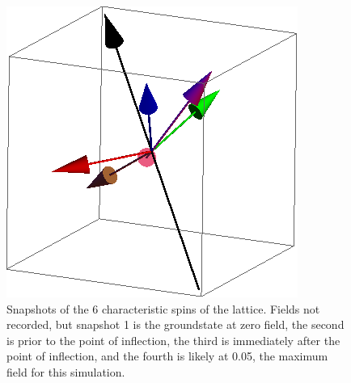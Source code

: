 \documentclass{article}
\begin{document}
\begin{figure}[ht]
\includegraphics[scale=0.27]{111_2000/4S000to005R.png}
\caption{Snapshots of the 6 characteristic spins of the lattice. Fields not recorded, but snapshot 1 is the groundstate
at zero field, the second is prior to the point of inflection, the third is immediately after the point of inflection,
and the fourth is likely at 0.05, the maximum field for this simulation.}
\end{figure}
\clearpage
\end{document}
